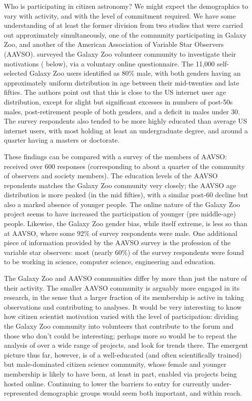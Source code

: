 \documentclass{ar2e}
\begin{document}
Who is participating in citizen astronomy? We might expect the demographics to
vary with activity, and with the level of commitment required. We have some
understanding of at least the former division from two studies that were
carried out approximately simultaneously, one of the community  participating
in Galaxy Zoo, and another of the  American Association of Variable Star
Observers (AAVSO).  \citet{Rad++13} surveyed the Galaxy Zoo volunteer
community to investigate their motivations (
below), via a voluntary online questionnaire. The 11,000 self-selected Galaxy
Zoo users identified as 80\% male, with both genders having an approximately
uniform distribution in age between their mid-twenties and late fifties. The
authors point out that this is close to the US internet user age distribution,
except for slight but significant excesses in numbers of post-50s males,
post-retirement people of both genders, and a deficit in males under 30. The
survey respondents  also tended to be more highly educated than average US
internet users, with most holding at least an undergraduate degree, and around
a quarter having a masters or doctorate. 

These findings can be compared with a survey of the members of AAVSO:
\citet{P+P2012} received over 600 responses  (corresponding to about a quarter
of the community of observers and society members). The education levels of
the AAVSO repondents matches the Galaxy Zoo community very closely; the AAVSO
age distribution is more peaked (in the mid fifties), with a similar post-60
decline but also a marked absence of younger people. The online nature of the
Galaxy Zoo project seems to have increased the participation of younger (pre
middle-age) people. Likewise, the Galaxy Zoo gender bias, while itself
extreme, is less so than at AAVSO, where some 92\% of survey respondents were
male. One additional piece of information provided by the AAVSO survey is the
profession of the variable star observers: most (nearly 60\%) of the survey
respondents were found to be working in science, computer science, engineering
and education.

The Galaxy Zoo and AAVSO communities differ by more than just the nature of
their activity. The smaller AAVSO community is arguably more engaged in its
research, in the sense that a larger fraction of its membership is active in
taking observations and contributing to analyses. It would be very interesting
to know how citizen scientist motivation varied with the level of
participation: dividing the Galaxy Zoo community into volunteers that
contribute to the  forum and those who don't could be interesting; perhaps
more so would be to repeat the analysis of \citeauthor{Rad++2013} over a wide
range of projects, and look for trends there. The emergent picture thus far,
however, is of a well-educated (and often scientifically trained)  but
male-dominated citizen science community, whose female and younger membership
is likely to have been, at least in part, enabled via projects being hosted
online. Continuing to lower the barriers to entry for currently
under-represented demographic groups would seem both important, and within
reach.
\end{document}
